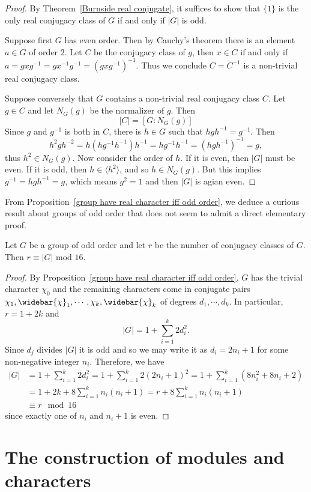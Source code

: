 \begin{proof}
By Theorem~\ref{Burnside real conjugate}, it suffices to show that $\{1\}$ is the only real conjugacy class of $G$ if and only if $|G|$ is odd.\par 
Suppose first $G$ has even order. Then by Cauchy's theorem there is an element $a\in G$ of order $2$. Let $C$ be the conjugacy class of $g$, then $x\in C$ if and only if $a=gxg^{-1}=gx^{-1}g^{-1}=(gxg^{-1})^{-1}$. Thus we conclude $C=C^{-1}$ is a non-trivial real conjugacy class.\par
Suppose conversely that $G$ contains a non-trivial real conjugacy class $C$. Let $g\in C$ and let $N_G(g)$ be the normalizer of $g$. Then
\[|C|=[G:N_G(g)]\]
Since $g$ and $g^{-1}$ is both in $C$, there is $h\in G$ such that $hgh^{-1}=g^{-1}$. Then
\[h^2gh^{-2}=h(hg^{-1}h^{-1})h^{-1}=hg^{-1}h^{-1}=(hgh^{-1})^{-1}=g,\]
thus $h^2\in N_G(g)$. Now consider the order of $h$. If it is even, then $|G|$ must be even. If it is odd, then $h\in\langle h^2\rangle$, and so $h\in N_G(g)$. But this implies $g^{-1}=hgh^{-1}=g$, which means $g^2=1$ and then $|G|$ is agian even.
\end{proof}
From Proposition~\ref{group have real character iff odd order}, we deduce a curious result about groups of odd order that does not seem to admit a direct elementary proof.
\begin{theorem}\label{conjugacy class of odd order group}
Let $G$ be a group of odd order and let $r$ be the number of conjugacy classes of $G$. Then $r\equiv |G|$ mod $16$.
\end{theorem}
\begin{proof}
By Proposition~\ref{group have real character iff odd order}, $G$ has the trivial character $\chi_0$ and the remaining characters come in conjugate pairs $\chi_1,\widebar{\chi}_1,\cdots,\chi_k,\widebar{\chi}_k$ of degrees $d_1,\cdots,d_k$. In particular, $r=1+2k$ and
\[|G|=1+\sum_{i=1}^{k}2d_i^2.\]
Since $d_j$ divides $|G|$ it is odd and so we may write it as $d_i=2n_i+1$ for some non-negative integer $n_i$. Therefore, we have
\begin{align*}
|G|&=1+\sum_{i=1}^{k}2d_i^2=1+\sum_{i=1}^{k}2(2n_i+1)^2=1+\sum_{i=1}^{k}(8n_i^2+8n_i+2)\\
&=1+2k+8\sum_{i=1}^{k}n_i(n_i+1)=r+8\sum_{i=1}^{k}n_i(n_i+1)\\
&\equiv r\mod 16
\end{align*}
since exactly one of $n_i$ and $n_i+1$ is even.
\end{proof}
\section{The construction of modules and characters}
